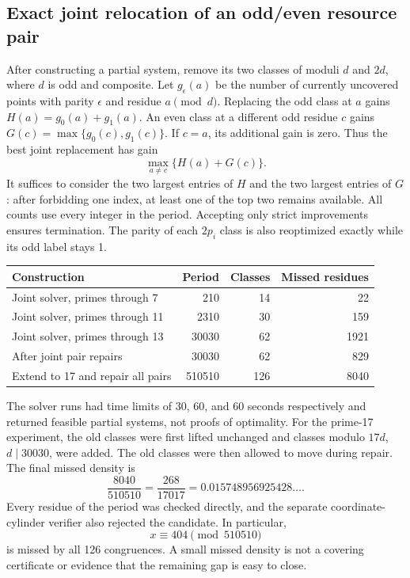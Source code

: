 \documentclass[11pt]{article}
\begin{document}
\subsection{Exact joint relocation of an odd/even resource pair}
After constructing a partial system, remove its two classes of moduli
$d$ and $2d$, where $d$ is odd and composite. Let $g_\epsilon(a)$ be the
number of currently uncovered points with parity $\epsilon$ and residue
$a\pmod d$. Replacing the odd class at $a$ gains
$H(a)=g_0(a)+g_1(a)$. An even class at a different odd residue $c$ gains
$G(c)=\max\{g_0(c),g_1(c)\}$. If $c=a$, its additional gain is zero.
Thus the best joint replacement has gain
\[
 \max_{a\ne c}\{H(a)+G(c)\}.
\]
It suffices to consider the two largest entries of $H$ and the two largest
entries of $G$: after forbidding one index, at least one of the top two
remains available. All counts use every integer in the period. Accepting
only strict improvements ensures termination. The parity of each $2p_i$
class is also reoptimized exactly while its odd label stays 1.

\begin{center}
\begin{tabular}{lrrr}
\toprule
Construction & Period & Classes & Missed residues\\
\midrule
Joint solver, primes through 7 & 210 & 14 & 22\\
Joint solver, primes through 11 & 2310 & 30 & 159\\
Joint solver, primes through 13 & 30030 & 62 & 1921\\
After joint pair repairs & 30030 & 62 & 829\\
Extend to 17 and repair all pairs & 510510 & 126 & 8040\\
\bottomrule
\end{tabular}
\end{center}
The solver runs had time limits of 30, 60, and 60 seconds respectively and
returned feasible partial systems, not proofs of optimality. For the
prime-17 experiment, the old classes were first lifted unchanged and
classes modulo $17d$, $d\mid30030$, were added. The old classes were then
allowed to move during repair. The final missed density is
\[
 \frac{8040}{510510}=\frac{268}{17017}=0.015748956925428\ldots.
\]
Every residue of the period was checked directly, and the separate
coordinate-cylinder verifier also rejected the candidate. In particular,
\[
 x\equiv404\pmod{510510}
\]
is missed by all 126 congruences. A small missed density is not a covering
certificate or evidence that the remaining gap is easy to close.
\end{document}
